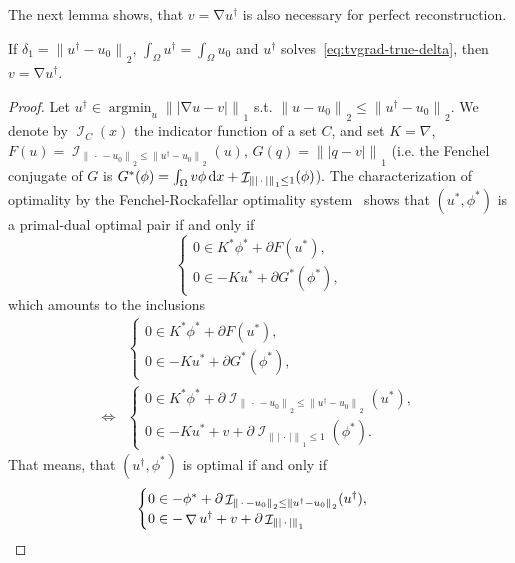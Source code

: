 \documentclass[twocolumn,envcountsame]{svjour3}
\newcommand{\norm}[2][]{{\|{#2}\|_{}}_{#1}}
\newcommand{\abs}[1]{|#1|}
\newcommand{\dummy}{\,\cdot\,}
\newcommand{\udag}{u^{\dagger}}
\newcommand{\dd}{\,\mathrm{d}}
\DeclareMathOperator*{\argmin}{argmin}
\DeclareMathOperator{\ind}{\mathcal{I}}
\let\div\relax
\DeclareMathOperator{\grad}{\nabla}
\DeclareMathOperator{\div}{div}
\begin{document}
The next lemma shows, that $v=\grad\udag$ is also necessary for perfect reconstruction.
\begin{lemma}
  If $\delta_{1} = \norm[2]{\udag-u_{0}}$, $\int_{\Omega}\udag = \int_{\Omega}u_{0}$ and $\udag$ solves~\eqref{eq:tvgrad-true-delta}, then $v=\grad\udag$.
\end{lemma}
\begin{proof}
  Let
  $\udag\in\argmin_u \norm[1]{\abs{\grad u - v}}$ s.t.
  $\norm[2]{u-u_0}\leq\norm[2]{\udag - u_0}$.
  We denote by $\ind_C(x)$ the indicator function of a set $C$,
  and  set $K = \nabla$,
  $F(u) =
  \ind_{\norm[2]{\dummy-u_0}\leq\norm[2]{\udag - u_0}}(u)$, $G(q) = \norm[1]{\abs{q-v}}$
  (i.e. the Fenchel conjugate of $G$ is
  $G^{*}(\phi) \\= \int_{\Omega} v\phi\dd x +
  \ind_{\norm[1]{\abs{\dummy}}\leq 1}(\phi)$).
  The characterization of optimality by the Fenchel-Rockafellar optimality system~\cite[Remark 4.2]{ekeland1976convex}
  shows that $(u^{*},\phi^{*})$ is a primal-dual optimal pair if and only if
  \begin{equation*}
    \begin{cases}
      0 \in K^*\phi^* + \partial F(u^*),\\
      0 \in -Ku^* + \partial G^*(\phi^*),
    \end{cases}
  \end{equation*}
  which amounts to the inclusions
  \begin{align*}
    &\begin{cases}
      0 \in K^*\phi^* + \partial F(u^*),\\
      0 \in -Ku^* + \partial G^*(\phi^*),
    \end{cases}\\
    \Leftrightarrow 
    &\begin{cases}
      0 \in K^*\phi^* + \partial \ind_{\norm[2]{\dummy-u_0}
        \leq\norm[2]{\udag - u_0}}(u^*),\\
      0 \in -Ku^* + v + \partial \ind_{\norm[1]{\abs{\dummy}}
        \leq 1}(\phi^*).
    \end{cases}
  \end{align*}
  That means, that $(\udag,\phi^*)$ is optimal if and only if
  \begin{align*}
    \begin{cases}
      0 \in -\div\phi^* + \partial \ind_{\norm[2]{\dummy-u_0}
        \leq\norm[2]{\udag - u_0}}(\udag),\\
      0 \in -\grad\udag + v + \partial 
      \ind_{\norm[1]{\abs{\dummy}}
}
\end{cases}
\end{align*}
\end{proof}
\end{document}
